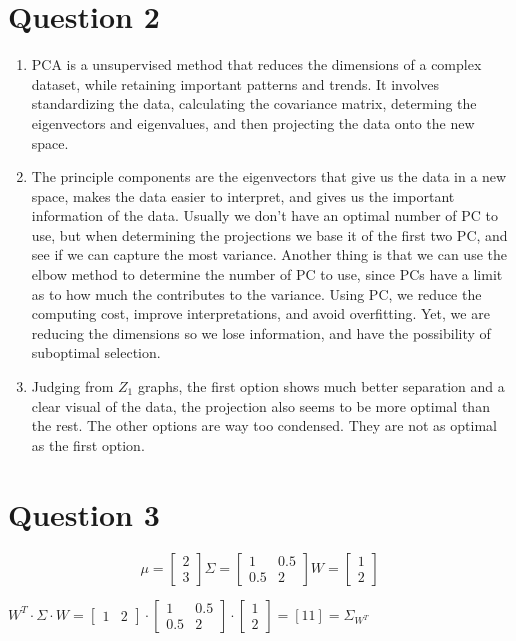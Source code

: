 \documentclass{article}
\begin{document}
\section*{Question 2}
\begin{enumerate}[label=(\alph*)]
    \item PCA is a unsupervised method that reduces the dimensions of a complex dataset, while retaining important patterns and trends.
    It involves standardizing the data, calculating the covariance matrix, determing the eigenvectors and eigenvalues, and then projecting the data onto the new space.
    \item The principle components are the eigenvectors that give us the data in a new space, makes the data easier to interpret, and gives us the important information of the data.
    Usually we don't have an optimal number of PC to use, but when determining the projections we base it of the first two PC, and see if we can capture the most variance. Another thing is that we can use the elbow method to determine the number of PC to use, since PCs have a limit as to how much the contributes
    to the variance. Using PC, we reduce the computing cost, improve interpretations, and avoid overfitting. Yet, we are reducing the dimensions 
    so we lose information, and have the possibility of suboptimal selection.
    \item Judging from $Z_1$ graphs, the first option shows much better separation and a clear visual of the data, the projection also seems to be more optimal than the rest. The other options are way too condensed. They are not as optimal as the first option.
\end{enumerate}
\section*{Question 3}
\[
    \mu = 
    \begin{bmatrix}
        2\\
        3
    \end{bmatrix}
    \Sigma = 
    \begin{bmatrix}
        1 & 0.5\\
        0.5 & 2
    \end{bmatrix}
    W = 
    \begin{bmatrix}
        1\\
        2
    \end{bmatrix}
\]

$W^T \cdot \Sigma \cdot W = 
\begin{bmatrix}
    1 & 2
\end{bmatrix}
\cdot
\begin{bmatrix}
    1 & 0.5\\
    0.5 & 2
\end{bmatrix}
\cdot
\begin{bmatrix}
    1\\
    2
\end{bmatrix}
=
[11]
= \Sigma_{W^T}
$
\end{document}
